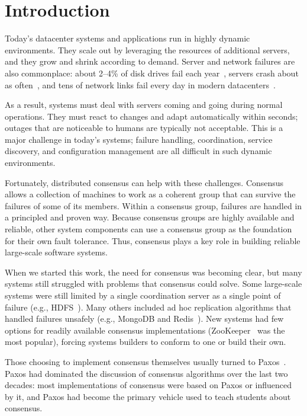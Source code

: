 \chapter{Introduction}
\label{introduction}


Today's datacenter systems and applications run in highly dynamic
environments. They scale out by leveraging the resources of additional
servers, and they grow and shrink according to demand. Server and
network failures are also commonplace:
about 2--4\% of disk drives fail each year~\cite{Schroeder:2007},
servers crash about as often~\cite{Dean:2009}, and tens of network links
fail every day in modern datacenters~\cite{Gill:2011}.

As a result, systems must deal with servers coming and going during
normal operations. They must react to changes and adapt automatically within
seconds; outages that are noticeable to humans are typically not acceptable.
This is a major challenge in today's systems; failure handling,
coordination, service discovery, and configuration management are all
difficult in such dynamic environments.

Fortunately, distributed consensus can help with these challenges.
Consensus allows a collection of machines to work as a coherent group
that can survive the failures of some of its members. Within a consensus
group, failures are handled in a principled and proven way. Because
consensus groups are highly available and reliable, other system
components can use a consensus group as the foundation for their own
fault tolerance. Thus, consensus plays a key role in building reliable
large-scale software systems.

When we started this work, the need for consensus was becoming clear,
but many systems still struggled with problems that consensus could
solve. Some large-scale systems were still limited by a single
coordination server as a single point of failure (e.g.,
HDFS~\cite{Hadoop2Release,HDFSHA}). Many others included ad hoc
replication algorithms that handled failures unsafely (e.g., MongoDB and
Redis~\cite{Kingsbury:Jepsen}). New systems had few options for readily
available consensus implementations (ZooKeeper~\cite{Hunt:2010} was the
most popular), forcing systems builders to conform to one or build their
own.

Those choosing to implement consensus themselves usually turned to
Paxos~\cite{Lamport:1998, Lamport:2001}. Paxos had dominated the
discussion of consensus algorithms over the last two decades: most
implementations of consensus were based on Paxos or influenced by it,
and Paxos had become the primary vehicle used to teach students about
consensus.

